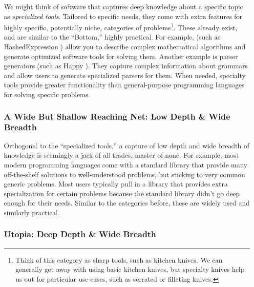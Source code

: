 We might think of software that captures deep knowledge about a specific topic
as \textit{specialized tools}. Tailored to specific needs, they come with extra
features for highly specific, potentially niche, categories of
problems\footnote{Think of this category as sharp tools, such as kitchen knives.
We can generally get away with using basic kitchen knives, but specialty knives
help us out for particular use-cases, such as serrated  or filleting
knives.}. These already exist, and are similar to the ``Bottom,'' highly
practical. For example,  (such as HashedExpression
\cite{HashedExpression}) allow you to describe complex mathematical algorithms
and generate optimized software tools for solving them. Another example is
parser generators (such as Happy \cite{Happy}). They capture complex information
about grammars and allow users to generate specialized parsers for them. When
needed, specialty tools provide greater functionality than general-purpose
programming languages for solving specific problems.

\subsubsection{A Wide But Shallow Reaching Net: Low Depth \& Wide Breadth}
\label{chap:ideology:sec:thoughts_of_generation:subsec:feasibility:subsubsec:modelling}

Orthogonal to the ``specialized tools,'' a capture of low depth and wide breadth
of knowledge is seemingly a jack of all trades, master of none. For example,
most modern programming languages come with a standard library that provide many
off-the-shelf solutions to well-understood problems, but sticking to very common
generic problems. Most users typically pull in a library that provides extra
specialization for certain problems because the standard library didn't go deep
enough for their needs. Similar to the categories before, these are widely used
and similarly practical.

\subsubsection{Utopia: Deep Depth \& Wide Breadth}
\label{chap:ideology:sec:thoughts_of_generation:subsec:feasibility:subsubsec:utopia}

